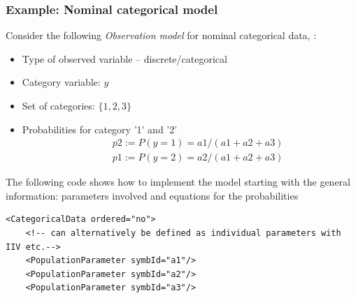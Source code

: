 { 
\subsubsection{Example: Nominal categorical model}

Consider the following \emph{Observation model} for nominal categorical 
data, \cite{Swat:2014bb}:

\begin{itemize}
\item
Type of observed variable -- discrete/categorical
\item
Category variable: $y$
\item
Set of categories: $\{1,2,3\}$
\item
Probabilities for category '1' and '2'
\begin{eqnarray}
&& p2 := P(y=1) = a1/(a1+a2+a3)  \nonumber \\
&& p1 := P(y=2) = a2/(a1+a2+a3)  \nonumber 
\end{eqnarray}
\end{itemize}
The following code shows how to implement the model 
starting with the general information: parameters involved and equations
for the probabilities 
\lstset{language=XML}
\begin{lstlisting}
<CategoricalData ordered="no">
    <!-- can alternatively be defined as individual parameters with IIV etc.-->
    <PopulationParameter symbId="a1"/> 
    <PopulationParameter symbId="a2"/>
    <PopulationParameter symbId="a3"/>
    

\end{lstlisting}}
